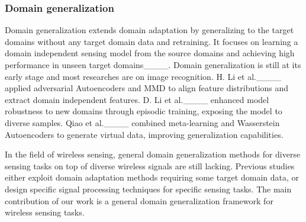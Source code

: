 \subsubsection{Domain generalization}
Domain generalization extends domain adaptation by generalizing to the target domains without any target domain data and retraining. It focuses on learning a domain independent sensing model from the source domains and achieving high performance in unseen target domains____. Domain generalization is still at its early stage and most researches are on image recognition. H. Li et al.____ applied adversarial Autoencoders and MMD to align feature distributions and extract domain independent features. D. Li et al.____ enhanced model robustness to new domains through episodic training, exposing the model to diverse samples. Qiao et al.____ combined meta-learning and Wasserstein Autoencoders to generate virtual data, improving generalization capabilities.   

In the field of wireless sensing, general domain generalization methods for diverse sensing tasks on top of diverse wireless signals are still lacking. Previous studies either exploit domain adaptation methods requiring some target domain data, or design specific signal processing techniques for specific sensing tasks. The main contribution of our work is a general domain generalization framework for wireless sensing tasks.